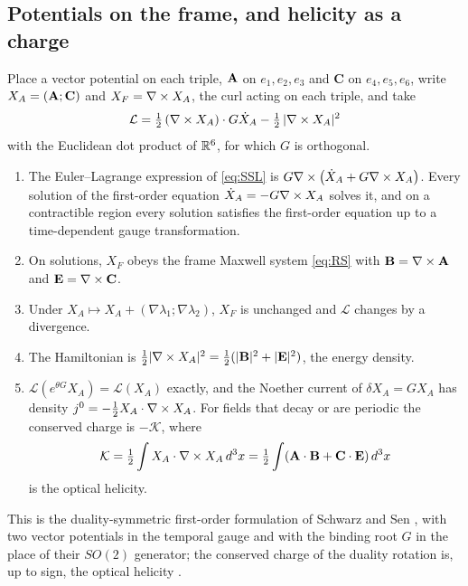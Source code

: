 \subsection{Potentials on the frame, and helicity as a charge}
\label{sec:potentials}

Place a vector potential on each triple, $\mathbf A$ on $e_1,e_2,e_3$ and $\mathbf C$ on $e_4,e_5,e_6$, write $X_A=(\mathbf A;\mathbf C)$ and
$X_F=\nabla\times X_A$, the curl acting on each triple, and take
\begin{equation}
\label{eq:SSL}
\mathcal L=\tfrac12\,(\nabla\times X_A)\cdot G\dot X_A-\tfrac12\,|\nabla\times X_A|^2
\end{equation}
with the Euclidean dot product of $\mathbb{R}^6$, for which $G$ is orthogonal.

\begin{theorem}
\label{thm:SS}
\begin{enumerate}[label=(\roman*),leftmargin=2.2em]
\item The Euler--Lagrange expression of \eqref{eq:SSL} is $G\nabla\times\bigl(\dot X_A+G\nabla\times X_A\bigr)$. Every solution of the first-order
equation $\dot X_A=-G\nabla\times X_A$ solves it, and on a contractible region every solution satisfies the first-order equation up to a
time-dependent gauge transformation.
\item On solutions, $X_F$ obeys the frame Maxwell system \eqref{eq:RS} with $\mathbf B=\nabla\times\mathbf A$ and $\mathbf E=\nabla\times\mathbf C$.
\item Under $X_A\mapsto X_A+(\nabla\lambda_1;\nabla\lambda_2)$, $X_F$ is unchanged and $\mathcal L$ changes by a divergence.
\item The Hamiltonian is $\tfrac12|\nabla\times X_A|^2=\tfrac12(|\mathbf B|^2+|\mathbf E|^2)$, the energy density.
\item $\mathcal L(e^{\theta G}X_A)=\mathcal L(X_A)$ exactly, and the Noether current of $\delta X_A=GX_A$ has density
$j^0=-\tfrac12X_A\cdot\nabla\times X_A$. For fields that decay or are periodic the conserved charge is $-\mathcal K$, where
\[
\mathcal K=\tfrac12\int X_A\cdot\nabla\times X_A\,d^3x=\tfrac12\int(\mathbf A\cdot\mathbf B+\mathbf C\cdot\mathbf E)\,d^3x
\]
is the optical helicity.
\end{enumerate}
\end{theorem}

This is the duality-symmetric first-order formulation of Schwarz and Sen \cite{SchwarzSen94}, with two vector potentials in the
temporal gauge and with the binding root $G$ in the place of their $SO(2)$ generator; the conserved charge of the duality rotation is,
up to sign, the optical helicity \cite{Calkin65,DeserTeitelboim76,CameronBarnettYao12}.

